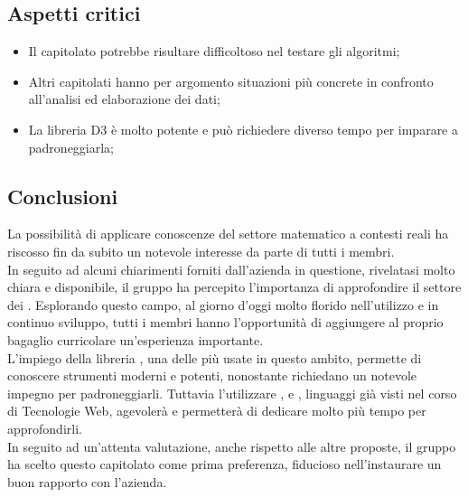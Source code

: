 \subsection{Aspetti critici}
\begin{itemize}
\item Il capitolato potrebbe risultare difficoltoso nel testare gli algoritmi;
\item Altri capitolati hanno per argomento situazioni più concrete in confronto all'analisi ed elaborazione dei dati;
\item La libreria D3 è molto potente e può richiedere diverso tempo per imparare a padroneggiarla; 
\end{itemize}

\subsection{Conclusioni}
La possibilità di applicare conoscenze del settore matematico a contesti reali ha riscosso fin da subito un notevole interesse da parte di tutti i membri.\\ In seguito ad alcuni chiarimenti forniti dall'azienda in questione, rivelatasi molto chiara e disponibile, il gruppo ha percepito l'importanza di approfondire il settore dei . Esplorando questo campo, al giorno d'oggi molto florido nell'utilizzo e in continuo sviluppo, tutti i membri hanno l'opportunità di aggiungere al proprio bagaglio curricolare un'esperienza importante.\\
L'impiego della libreria , una delle più usate in questo ambito, permette di conoscere strumenti moderni e potenti, nonostante richiedano un notevole impegno per padroneggiarli. Tuttavia l'utilizzare ,  e , linguaggi già visti nel corso di Tecnologie Web, agevolerà e permetterà di dedicare molto più tempo per approfondirli.\\In seguito ad un'attenta valutazione, anche rispetto alle altre proposte, il gruppo ha scelto questo capitolato come prima preferenza, fiducioso nell'instaurare un buon rapporto con l'azienda.
